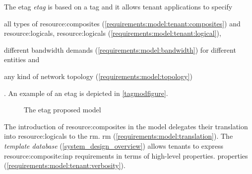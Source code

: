 \ifdefined\THESISSUMMARY \else
{}
\fi
The
\ifdefined\THESISSUMMARY 
\gls{etag}
\else
\textit{\gls{etag}} is based on a \gls{tag} and it
\fi
allows tenant applications to specify
\begin{mylist}
    \item all types of \glspl{resource:composite}
    \ifdefined\THESISSUMMARY \else
    (\cmark \ref{requirements:model:tenant:composites})
    \fi
    and
    \ifdefined\THESISSUMMARY
    \glspl{resource:logical},
    \else
    \glspl{resource:logical} (\cmark \ref{requirements:model:tenant:logical}),\fi
    \item different bandwidth demands
    \ifdefined\THESISSUMMARY \else
    (\cmark \ref{requirements:model:bandwidth})
    \fi
    for different entities and
    \item any kind of network topology
    \ifdefined\THESISSUMMARY \else
    (\cmark \ref{requirements:model:topology})
    \fi
\end{mylist}.
An example of an \gls{etag} is depicted in \autoref{tagmodfigure}.

\begin{figure}[!htb]
    \centering
    \usebox{\tagmodfigure}
    \caption{The \gls{etag} proposed model}
    \label{tagmodfigure}
\end{figure}

The introduction of \glspl{resource:composite} in the model delegates their translation into \glspl{resource:logical} to the
\ifdefined\THESISSUMMARY
\gls{rm}.
\else
\gls{rm} (\cmark \ref{requirements:model:translation}).
\fi
The \textit{template database}
\ifdefined\THESISSUMMARY \else
(\autoref{system_design_overview})
\fi
allows tenants to express \gls{resource:composite:inp} requirements in terms of high-level
\ifdefined\THESISSUMMARY
properties.
\else
properties (\cmark \ref{requirements:model:tenant:verbosity}).
\fi
